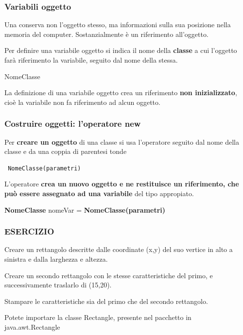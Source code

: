 \begin{frame}
\frametitle{Variabili oggetto}
\begin{block}{}
Una  conserva non l'oggetto stesso, ma informazioni sulla sua posizione nella memoria del computer.
Sostanzialmente è un \alert{riferimento} all'oggetto.
\end{block}
\begin{block}{}
Per definire una variabile oggetto si indica il nome della \textbf{classe} a cui l'oggetto farà riferimento la variabile,
seguito dal nome della  stessa.
\begin{center}
\alert{NomeClasse} 
\end{center}
\end{block}
\begin{block}{}
La definizione di una variabile oggetto crea un riferimento \textbf{non inizializzato}, cioè la variabile non fa riferimento ad 
alcun oggetto.
\end{block}
\end{frame}

\begin{frame}
\frametitle{Costruire oggetti: l'operatore new}
\begin{block}{}
Per \textbf{creare un oggetto} di una classe si usa l'operatore  seguito dal \alert{nome della classe} e da una coppia
di parentesi tonde
\begin{center}
\texttt{ \alert{NomeClasse}(parametri)}
\end{center}
\end{block}
\begin{block}{}
L'operatore  \textbf{crea un nuovo oggetto e ne restituisce un riferimento, che può essere assegnato ad una variabile}
del tipo appropiato.
\begin{center}
\textbf{NomeClasse} \alert{nomeVar} =  \textbf{NomeClasse(parametri)}
\end{center}
\end{block}
\end{frame}

\begin{frame}
\frametitle{ESERCIZIO}
\begin{block}{}
Creare un rettangolo descritte dalle coordinate (x,y) del suo vertice in alto a sinistra e dalla larghezza e altezza.
\end{block}
\begin{block}{}
Creare un secondo rettangolo con le stesse caratteristiche del primo, e successivamente traslarlo di (15,20).
\end{block}
\begin{block}{}
Stampare le caratteristiche sia del primo che del secondo rettangolo.
\end{block}
\begin{block}{}
Potete importare la classe Rectangle, presente nel pacchetto in \alert{java.awt.Rectangle}
\end{block}
\end{frame}


